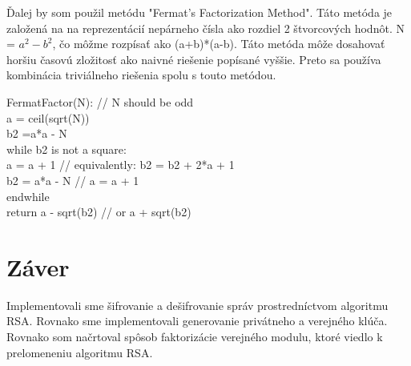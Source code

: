 \documentclass[11pt,a4paper,titlepage,final]{article}
\begin{document}
Ďalej by som použil metódu "Fermat's Factorization Method". Táto metóda je založená na na reprezentácií nepárneho čísla ako rozdiel 2 štvorcových hodnôt. N = $a^2 - b^2$, čo môžme rozpísať ako (a+b)*(a-b). Táto metóda môže dosahovať horšiu časovú zložitosť ako naivné riešenie popísané vyššie. Preto sa používa kombinácia triviálneho riešenia spolu s touto metódou.

FermatFactor(N): // N should be odd \\
    a = ceil(sqrt(N)) \\
    b2 =a*a - N \\
    while b2 is not a square: \\
        a = a + 1    // equivalently: b2 = b2 + 2*a + 1 \\
        b2 = a*a - N //               a = a + 1 \\
    endwhile \\
    return a - sqrt(b2) // or a + sqrt(b2)\\


\section{Záver}
Implementovali sme šifrovanie a dešifrovanie správ prostredníctvom algoritmu RSA. Rovnako sme implementovali generovanie privátneho a verejného klúča. Rovnako som načrtoval spôsob faktorizácie verejného modulu, ktoré viedlo k prelomeneniu algoritmu RSA.
\end{document}
